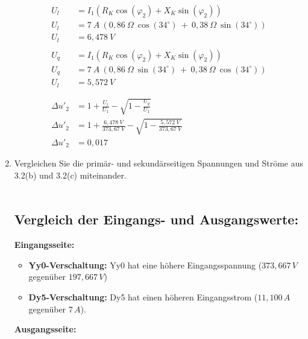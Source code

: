 \begin{enumerate}[label=\alph*)]
	      \begin{align*}
		      U_l         & = I_1(R_K\cos(\varphi_2)+X_K\sin(\varphi_2))                             \\
		      U_l         & = 7\ A\ (0,86\ \Omega\ \cos(34^\circ)\ +\ 0,38\ \Omega\ \sin(34^\circ))  \\
		      U_l         & = 6,478\ V                                                               \\
		      \\
		      U_q         & = I_1(R_K\cos(\varphi_2)+X_K\sin(\varphi_2))                             \\
		      U_q         & =  7\ A\ (0,86\ \Omega\ \sin(34^\circ)\ +\ 0,38\ \Omega\ \cos(34^\circ)) \\
		      U_l         & = 5,572 \ V                                                              \\                                                                \\
		      \\
		      \Delta u'_2 & = 1+\frac{U_l}{U_1} - \sqrt{1-\frac{U_q}{U_1}}                           \\
		      \Delta u'_2 & = 1+\frac{6,478\ V}{373,67\ V} - \sqrt{1-\frac{5,572 \ V}{373,67\ V}}    \\
		      \Delta u'_2 & = 0,017
	      \end{align*}
	      \pagebreak
	\item Vergleichen Sie die primär- und sekundärseitigen Spannungen und Ströme aus
	      3.2(b) und 3.2(c) miteinander.\\ \ \\

	      \subsection*{Vergleich der Eingangs- und Ausgangswerte:}

	      \textbf{Eingangsseite:}

	      \begin{itemize}
		      \item \textbf{Yy0-Verschaltung:} Yy0 hat eine höhere Eingangsspannung (\(373,667 \, V\) gegenüber \(197,667 \, V\))
		      \item \textbf{Dy5-Verschaltung:} Dy5 hat einen höheren Eingangsstrom (\(11,100 \, A\) gegenüber \(7 \, A\)).
	      \end{itemize}

	      \textbf{Ausgangsseite:}


\end{enumerate}
